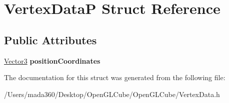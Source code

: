 \hypertarget{struct_vertex_data_p}{}\section{Vertex\+Data\+P Struct Reference}
\label{struct_vertex_data_p}
\subsection*{Public Attributes}
\begin{DoxyCompactItemize}
\item 
\hypertarget{struct_vertex_data_p_a5783161ce9ca57ea80d231379e287062}{}\hyperlink{struct_vector3}{Vector3} {\bfseries position\+Coordinates}\label{struct_vertex_data_p_a5783161ce9ca57ea80d231379e287062}

\end{DoxyCompactItemize}


The documentation for this struct was generated from the following file\+:\begin{DoxyCompactItemize}
\item 
/\+Users/mada360/\+Desktop/\+Open\+G\+L\+Cube/\+Open\+G\+L\+Cube/Vertex\+Data.\+h\end{DoxyCompactItemize}
